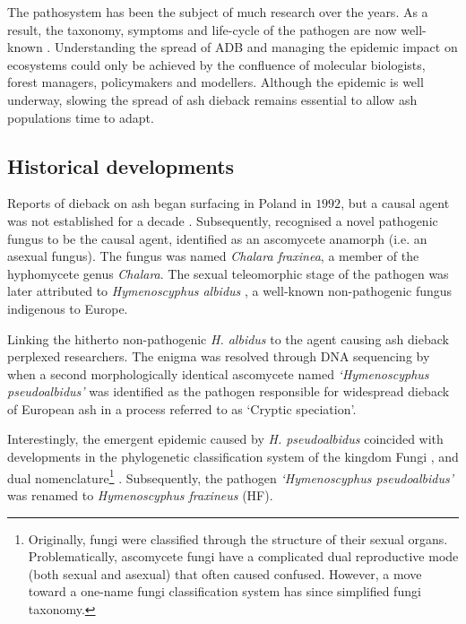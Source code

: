 The pathosystem has been the subject of much research over the years. As a result, the taxonomy, 
symptoms and life-cycle of the pathogen are  now well-known \cite{https://doi.org/10.1111/mpp.12073}. 
Understanding the spread of ADB and managing the epidemic impact on ecosystems could only be achieved
by the confluence of molecular biologists, forest managers, policymakers and modellers. Although the epidemic
is well underway, slowing the spread of ash dieback remains essential to allow ash populations time to adapt.

\subsection{Historical developments}

Reports of dieback on ash began surfacing in Poland in $1992$, but a causal agent was not established
for a decade \cite{kowalski2001zamieraniu, coetsee2000xenochalara}. Subsequently, \cite{kowalski2006chalara} 
recognised a novel pathogenic fungus to be the causal agent, identified as an ascomycete anamorph (i.e. an asexual fungus).
The fungus was named \textit{Chalara fraxinea}, a member of the hyphomycete genus \textit{Chalara}. 
The sexual teleomorphic stage of the pathogen was later attributed to \textit{Hymenoscyphus albidus} 
\cite{kowalski2009teleomorph}, a well-known non-pathogenic fungus indigenous to Europe.

Linking the hitherto non-pathogenic \textit{H. albidus} to the agent causing ash dieback perplexed researchers. 
The enigma was resolved through DNA sequencing by \cite{queloz2011cryptic} when a second morphologically identical
ascomycete named \textit{`Hymenoscyphus pseudoalbidus'} was identified as the pathogen responsible for widespread dieback
of European ash in a process referred to as `Cryptic speciation'.

Interestingly, the emergent epidemic caused by \textit{H. pseudoalbidus} coincided with developments 
in the phylogenetic classification system of the kingdom Fungi \cite{hibbett2007higher}, 
and dual nomenclature\footnote{Originally, fungi were classified through the structure of their sexual organs.
Problematically, ascomycete fungi have a complicated dual reproductive mode (both sexual and asexual) that often caused confused. 
However, a move toward a one-name fungi classification system has since simplified fungi taxonomy.} 
\cite{wingfield2012one}. Subsequently, the pathogen \textit{`Hymenoscyphus pseudoalbidus'} was renamed to
\textit{Hymenoscyphus fraxineus} (HF).

